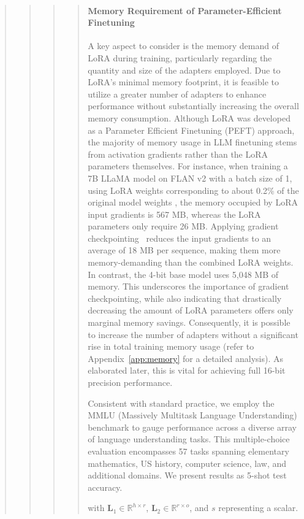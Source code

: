\begin{quote}
\begin{quote}
\begin{quote}
\begin{quote}
\paragraph{Memory Requirement of Parameter-Efficient Finetuning} A key aspect to consider is the memory demand of LoRA during training, particularly regarding the quantity and size of the adapters employed. Due to LoRA's minimal memory footprint, it is feasible to utilize a greater number of adapters to enhance performance without substantially increasing the overall memory consumption. Although LoRA was developed as a Parameter Efficient Finetuning (PEFT) approach, the majority of memory usage in LLM finetuning stems from activation gradients rather than the LoRA parameters themselves. For instance, when training a 7B LLaMA model on FLAN v2 with a batch size of 1, using LoRA weights corresponding to about 0.2\% of the original model weights \citep{hu2021lora,liu2022few}, the memory occupied by LoRA input gradients is 567 MB, whereas the LoRA parameters only require 26 MB. Applying gradient checkpointing~\citep{chen2016training} reduces the input gradients to an average of 18 MB per sequence, making them more memory-demanding than the combined LoRA weights. In contrast, the 4-bit base model uses 5,048 MB of memory. This underscores the importance of gradient checkpointing, while also indicating that drastically decreasing the amount of LoRA parameters offers only marginal memory savings. Consequently, it is possible to increase the number of adapters without a significant rise in total training memory usage (refer to Appendix~\ref{app:memory} for a detailed analysis). As elaborated later, this is vital for achieving full 16-bit precision performance.

Consistent with standard practice, we employ the MMLU (Massively Multitask Language Understanding) benchmark \citep{hendrycksmeasuring} to gauge performance across a diverse array of language understanding tasks. This multiple-choice evaluation encompasses 57 tasks spanning elementary mathematics, US history, computer science, law, and additional domains. We present results as 5-shot test accuracy.

with $\mathbf{L}_1\in \mathbb{R}^{h\times r}$, $\mathbf{L}_2\in \mathbb{R}^{r\times o}$, and $s$ representing a scalar.


\end{quote}
\end{quote}
\end{quote}
\end{quote}
